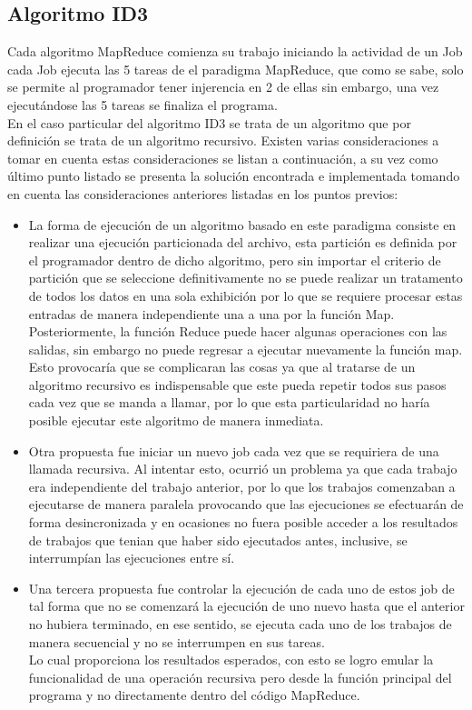 \subsection{Algoritmo ID3}
Cada algoritmo MapReduce comienza su trabajo iniciando la actividad de un Job cada Job ejecuta las 5 tareas de el paradigma MapReduce, que como se sabe, solo se permite al programador tener injerencia en 2 de ellas sin embargo, una vez ejecutándose las 5 tareas se finaliza el programa. 
\\
En el caso particular del algoritmo ID3 se trata de un algoritmo que por definición se trata de un algoritmo recursivo.
Existen varias consideraciones a tomar en cuenta estas consideraciones se listan a continuación, a su vez como último punto listado se presenta la solución encontrada e implementada tomando en cuenta las consideraciones anteriores listadas en los puntos previos:
\begin{itemize}
	\item La forma de ejecución de un algoritmo basado en este paradigma consiste en realizar una ejecución particionada del archivo, esta partición es definida por el programador dentro de dicho algoritmo, pero sin importar el criterio de partición que se seleccione definitivamente no se puede realizar un tratamento de todos los datos en una sola exhibición por lo que se requiere procesar estas entradas de manera independiente una a una por la función Map.\\
	Posteriormente, la función Reduce puede hacer algunas operaciones con las salidas, sin embargo no puede regresar a ejecutar nuevamente la función map. \\
	Esto provocaría que se complicaran las cosas ya que al tratarse de un algoritmo recursivo es indispensable que este pueda repetir todos sus pasos cada vez que se manda a llamar, por lo que esta particularidad no haría posible ejecutar este algoritmo de manera inmediata.\\ 
	\item Otra propuesta fue iniciar un nuevo job cada vez que se requiriera de una llamada recursiva. Al intentar esto, ocurrió un problema ya que cada trabajo era independiente del trabajo anterior, por lo que los trabajos comenzaban a ejecutarse de manera paralela provocando que las ejecuciones se efectuarán de forma desincronizada y en ocasiones no fuera posible acceder a los resultados de trabajos que tenian que haber sido ejecutados antes, inclusive, se interrumpían las ejecuciones entre sí.
	\item Una tercera propuesta fue controlar la ejecución de cada uno de estos job de tal forma que no se comenzará la ejecución de uno nuevo hasta que el anterior no hubiera terminado, en ese sentido, se ejecuta cada uno de los trabajos de manera secuencial y no se interrumpen en sus tareas. \\
	Lo cual proporciona los resultados esperados, con esto se logro emular la funcionalidad de una operación recursiva pero desde la función principal del programa y no directamente dentro del código MapReduce. \\	
\end{itemize}

